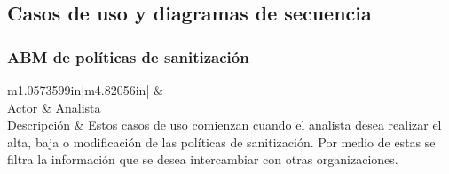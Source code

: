\bigskip

\subsection{Casos de uso y diagramas de secuencia}

\bigskip

\subsubsection{ABM de políticas de sanitización}
\begin{flushleft}
	\tablefirsthead{}
	\tablehead{}
	\tabletail{}
	\tablelasttail{}
	\begin{supertabular}{m{1.0573599in}|m{4.82056in}|}
		 &
		\\\hline
		{ Actor} &
		{ Analista}\\
		{ Descripción} &
		{ Estos casos de uso comienzan cuando el analista desea realizar el alta, baja o
			modificación de las políticas de sanitización. Por medio de estas se filtra la información que se desea intercambiar
			con otras organizaciones.}\\\hhline{~-}
	\end{supertabular}
\end{flushleft}

\bigskip


